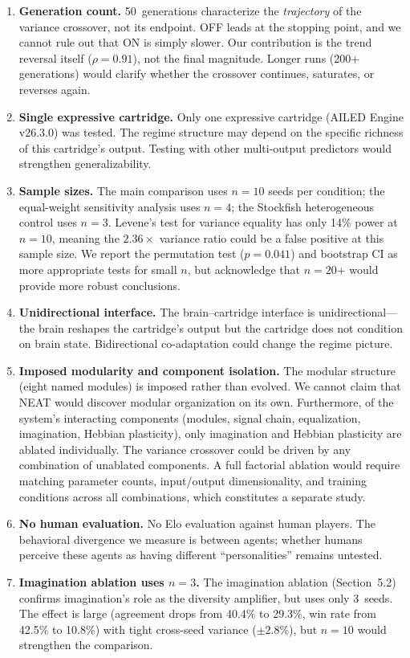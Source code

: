 \documentclass[11pt,a4paper]{article}
\begin{document}
\begin{enumerate}
    \item \textbf{Generation count.} 50~generations characterize the \emph{trajectory} of the variance crossover, not its endpoint. OFF leads at the stopping point, and we cannot rule out that ON is simply slower. Our contribution is the trend reversal itself ($\rho = 0.91$), not the final magnitude. Longer runs (200+ generations) would clarify whether the crossover continues, saturates, or reverses again.

    \item \textbf{Single expressive cartridge.} Only one expressive cartridge (AILED Engine v26.3.0) was tested. The regime structure may depend on the specific richness of this cartridge's output. Testing with other multi-output predictors would strengthen generalizability.

    \item \textbf{Sample sizes.} The main comparison uses $n = 10$ seeds per condition; the equal-weight sensitivity analysis uses $n = 4$; the Stockfish heterogeneous control uses $n = 3$. Levene's test for variance equality has only 14\% power at $n = 10$, meaning the $2.36\times$ variance ratio could be a false positive at this sample size. We report the permutation test ($p = 0.041$) and bootstrap CI as more appropriate tests for small $n$, but acknowledge that $n = 20$+ would provide more robust conclusions.

    \item \textbf{Unidirectional interface.} The brain--cartridge interface is unidirectional---the brain reshapes the cartridge's output but the cartridge does not condition on brain state. Bidirectional co-adaptation could change the regime picture.

    \item \textbf{Imposed modularity and component isolation.} The modular structure (eight named modules) is imposed rather than evolved. We cannot claim that NEAT would discover modular organization on its own. Furthermore, of the system's interacting components (modules, signal chain, equalization, imagination, Hebbian plasticity), only imagination and Hebbian plasticity are ablated individually. The variance crossover could be driven by any combination of unablated components. A full factorial ablation would require matching parameter counts, input/output dimensionality, and training conditions across all combinations, which constitutes a separate study.

    \item \textbf{No human evaluation.} No Elo evaluation against human players. The behavioral divergence we measure is between agents; whether humans perceive these agents as having different ``personalities'' remains untested.

    \item \textbf{Imagination ablation uses $n = 3$.} The imagination ablation (Section~5.2) confirms imagination's role as the diversity amplifier, but uses only 3~seeds. The effect is large (agreement drops from 40.4\% to 29.3\%, win rate from 42.5\% to 10.8\%) with tight cross-seed variance ($\pm 2.8\%$), but $n = 10$ would strengthen the comparison.
\end{enumerate}
\end{document}
